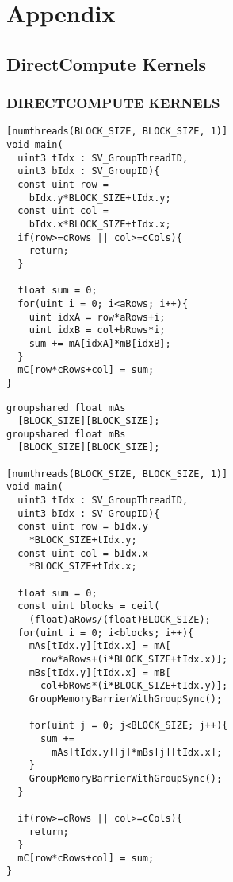 \section{Appendix}

\subsection{DirectCompute Kernels}
\begin{frame}[fragile]
\frametitle{DIRECTCOMPUTE KERNELS}

\begin{multicols}{2}
\begin{lstlisting}
[numthreads(BLOCK_SIZE, BLOCK_SIZE, 1)]
void main(
  uint3 tIdx : SV_GroupThreadID,
  uint3 bIdx : SV_GroupID){
  const uint row =
    bIdx.y*BLOCK_SIZE+tIdx.y;
  const uint col =
    bIdx.x*BLOCK_SIZE+tIdx.x;
  if(row>=cRows || col>=cCols){
    return;
  }

  float sum = 0;
  for(uint i = 0; i<aRows; i++){
    uint idxA = row*aRows+i;
    uint idxB = col+bRows*i;
    sum += mA[idxA]*mB[idxB];
  }
  mC[row*cRows+col] = sum;
}
\end{lstlisting}
\begin{lstlisting}
groupshared float mAs
  [BLOCK_SIZE][BLOCK_SIZE];
groupshared float mBs
  [BLOCK_SIZE][BLOCK_SIZE];

[numthreads(BLOCK_SIZE, BLOCK_SIZE, 1)]
void main(
  uint3 tIdx : SV_GroupThreadID,
  uint3 bIdx : SV_GroupID){
  const uint row = bIdx.y
    *BLOCK_SIZE+tIdx.y;
  const uint col = bIdx.x
    *BLOCK_SIZE+tIdx.x;
  
  float sum = 0;
  const uint blocks = ceil( 
    (float)aRows/(float)BLOCK_SIZE);
  for(uint i = 0; i<blocks; i++){
    mAs[tIdx.y][tIdx.x] = mA[ 
      row*aRows+(i*BLOCK_SIZE+tIdx.x)];
    mBs[tIdx.y][tIdx.x] = mB[ 
      col+bRows*(i*BLOCK_SIZE+tIdx.y)];
    GroupMemoryBarrierWithGroupSync();

    for(uint j = 0; j<BLOCK_SIZE; j++){
      sum += 
        mAs[tIdx.y][j]*mBs[j][tIdx.x];
    }
    GroupMemoryBarrierWithGroupSync();
  }
  
  if(row>=cRows || col>=cCols){
    return;
  }
  mC[row*cRows+col] = sum;
}
\end{lstlisting}
\end{multicols}

\end{frame}

